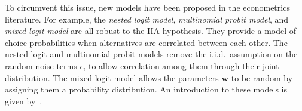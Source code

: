 To circumvent this issue, new models have been proposed in the econometrics literature.
For example, the \emph{nested logit model}, \emph{multinomial probit model}, and \emph{mixed logit model} are all robust to the IIA hypothesis.
They provide a model of choice probabilities when alternatives are correlated between each other.
The nested logit and multinomial probit models remove the i.i.d.\ assumption on the random noise terms $\epsilon_i$ to allow correlation among them through their joint distribution.
The mixed logit model allows the parameters $\bm{w}$ to be random by assigning them a probability distribution.
An introduction to these models is given by~\citet{train2009discrete}.

